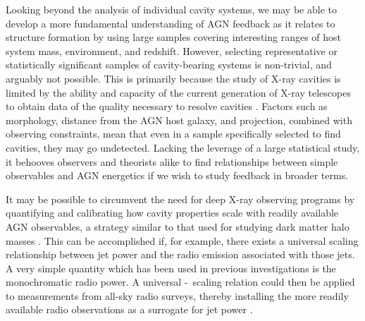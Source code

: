 \documentclass{emulateapj}
\begin{document}

Looking beyond the analysis of individual cavity systems, we may be
able to develop a more fundamental understanding of AGN feedback as it
relates to structure formation by using large samples covering
interesting ranges of host system mass, environment, and
redshift. However, selecting representative or statistically
significant samples of cavity-bearing systems is non-trivial, and
arguably not possible. This is primarily because the study of X-ray
cavities is limited by the ability and capacity of the current
generation of X-ray telescopes to obtain data of the quality necessary
to resolve cavities \citep{2009arXiv0909.0397B}. Factors such as
morphology, distance from the AGN host galaxy, and projection,
combined with observing constraints, mean that even in a sample
specifically selected to find cavities, they may go
undetected. Lacking the leverage of a large statistical study, it
behooves observers and theorists alike to find relationships between
simple observables and AGN energetics if we wish to study feedback in
broader terms.

It may be possible to circumvent the need for deep X-ray observing
programs by quantifying and calibrating how cavity properties scale
with readily available AGN observables, a strategy similar to that
used for studying dark matter halo masses \citep[\eg][]{kravtsov06,
2007ApJ...668..772M, 2009A&A...498..361P}. This can be accomplished
if, for example, there exists a universal scaling relationship between
jet power and the radio emission associated with those jets. A very
simple quantity which has been used in previous investigations is the
monochromatic radio power. A universal \pjet-\prad\ scaling relation
could then be applied to measurements from all-sky radio surveys,
thereby installing the more readily available radio observations as a
surrogate for jet power \citep{croton06, 2006MNRAS.366..397S}.
\end{document}
